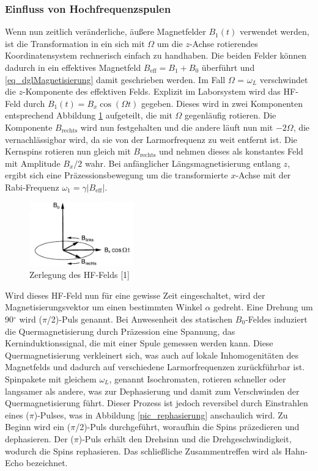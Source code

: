 \subsubsection{Einfluss von Hochfrequenzspulen}
\label{sec_hochfrequenz}
Wenn nun zeitlich veränderliche, äußere Magnetfelder $B_1(t)$ verwendet werden, ist die Transformation in ein sich mit $\Omega$ um die $z$-Achse rotierendes 
Koordinatensystem rechnerisch einfach zu handhaben. Die beiden Felder können dadurch in ein effektives Magnetfeld $B_\text{eff} = B_1 + B_0$ überführt
und \eqref{eq_dglMagnetisierung} damit geschrieben werden. Im Fall $\Omega$ = $\omega_L$ verschwindet die $z$-Komponente des effektiven Felds. Explizit im Laborsystem wird
das HF-Feld durch $B_1(t) = B_x \cos(\Omega t)$ gegeben. Dieses wird in zwei Komponenten entsprechend Abbildung \ref{pic_rotSystem} aufgeteilt, die mit
$\Omega$ gegenläufig rotieren. Die Komponente $B_\text{rechts}$ wird nun festgehalten und die andere läuft nun mit $-2\Omega$, die vernachlässigbar wird,
da sie von der Larmorfrequenz zu weit entfernt ist. Die Kernspins rotieren nun gleich mit $B_\text{rechts}$ und nehmen dieses als konstantes Feld mit 
Amplitude $B_x /2$ wahr. Bei anfänglicher Längsmagnetisierung entlang $z$, ergibt sich eine Präzessionsbewegung um die transformierte $x$-Achse mit der
Rabi-Frequenz $\omega_1 = \gamma |B_\text{eff}|$.
\begin{figure}[H]
 \includegraphics[width=0.4\textwidth]{../pics/rotSystem.jpg}
 \caption{Zerlegung des HF-Felds [1]}
 \label{pic_rotSystem}
\end{figure}
\noindent
Wird dieses HF-Feld nun für eine gewisse Zeit eingeschaltet, wird der Magnetisierungsvektor um einen bestimmten Winkel $\alpha$ gedreht. Eine Drehung um
90$^\circ$ wird ($\pi$/2)-Puls genannt. Bei Anwesenheit des statischen $B_0$-Feldes induziert die Quermagnetisierung durch Präzession eine Spannung, das
Kerninduktionssignal, die mit einer Spule gemessen werden kann. Diese Quermagnetisierung verkleinert sich, was auch auf lokale Inhomogenitäten des 
Magnetfelds und dadurch auf verschiedene Larmorfrequenzen zurückführbar ist. Spinpakete mit gleichem $\omega_L$, genannt Isochromaten, rotieren schneller
oder langsamer als andere, was zur Dephasierung und damit zum Verschwinden der Quermagnetisierung führt. Dieser Prozess ist jedoch reversibel durch 
Einstrahlen eines ($\pi$)-Pulses, was in Abbildung \ref{pic_rephasierung} anschaulich wird. Zu Beginn wird ein ($\pi$/2)-Puls durchgeführt, woraufhin die
Spins präzedieren und dephasieren. Der ($\pi$)-Puls erhält den Drehsinn und die Drehgeschwindigkeit, wodurch die Spins rephasieren. Das schließliche 
Zusammentreffen wird als Hahn-Echo bezeichnet.

